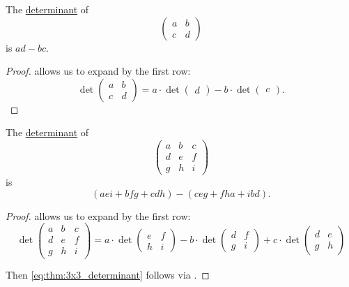 \begin{corollary}\label{thm:2x2_determinant}
  The \hyperref[def:determinant]{determinant} of
  \begin{equation*}
    \begin{pmatrix}
      a & b \\
      c & d
    \end{pmatrix}
  \end{equation*}
  is \( ad - bc \).
\end{corollary}
\begin{proof}
   allows us to expand by the first row:
  \begin{equation*}
    \det \begin{pmatrix}
      a & b \\
      c & d
    \end{pmatrix}
    =
    a \cdot \det \begin{pmatrix} d \end{pmatrix} - b \cdot \det \begin{pmatrix} c \end{pmatrix}.
  \end{equation*}
\end{proof}

\begin{corollary}\label{thm:3x3_determinant}
  The \hyperref[def:determinant]{determinant} of
  \begin{equation*}
    \begin{pmatrix}
      a & b & c \\
      d & e & f \\
      g & h & i
    \end{pmatrix}
  \end{equation*}
  is
  \begin{equation}\label{eq:thm:3x3_determinant}
    (aei + bfg + cdh) - (ceg + fha + ibd).
  \end{equation}
\end{corollary}
\begin{proof}
   allows us to expand by the first row:
  \begin{equation*}
    \det \begin{pmatrix}
      a & b & c \\
      d & e & f \\
      g & h & i
    \end{pmatrix}
    =
    a \cdot \det \begin{pmatrix}
      e & f \\
      h & i
    \end{pmatrix}
    -
    b \cdot \det \begin{pmatrix}
      d & f \\
      g & i
    \end{pmatrix}
    +
    c \cdot \det \begin{pmatrix}
      d & e \\
      g & h
    \end{pmatrix}
  \end{equation*}

  Then \eqref{eq:thm:3x3_determinant} follows via .
\end{proof}

